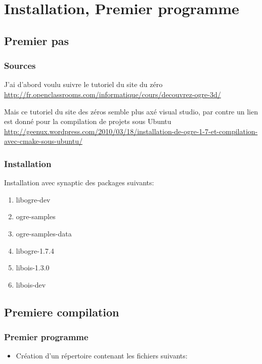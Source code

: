 
\chapter{Installation, Premier programme}


\section{Premier pas}
\subsection{Sources}
J'ai d'abord voulu suivre le tutoriel du site du z\'ero
\url{http://fr.openclassrooms.com/informatique/cours/decouvrez-ogre-3d/}\newline

Mais ce tutoriel du site des zéros semble plus axé visual studio, par contre un lien est donné pour la compilation de projets sous Ubuntu \url{http://geenux.wordpress.com/2010/03/18/installation-de-ogre-1-7-et-compilation-avec-cmake-sous-ubuntu/}


\subsection{Installation}
Installation avec synaptic des packages suivants:
\begin{enumerate}
\item libogre-dev
\item ogre-samples
\item ogre-samples-data
\item libogre-1.7.4
\item libois-1.3.0
\item libois-dev 
\end{enumerate}






\section{Premiere compilation}

\subsection{Premier programme}

\begin{itemize}
\item Création d'un répertoire contenant les fichiers suivants:
\end{itemize}


